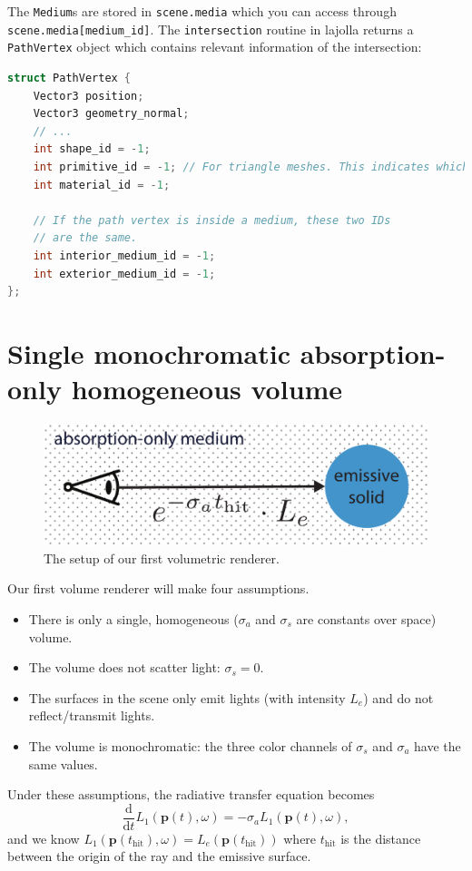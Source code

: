 The \lstinline{Medium}s are stored in \lstinline{scene.media} which you can access through \lstinline{scene.media[medium_id]}. The \lstinline{intersection} routine in lajolla returns a \lstinline{PathVertex} object which contains relevant information of the intersection:
\begin{lstlisting}[language=c++]
struct PathVertex {
    Vector3 position;
    Vector3 geometry_normal;
    // ...
    int shape_id = -1;
    int primitive_id = -1; // For triangle meshes. This indicates which triangle it hits.
    int material_id = -1;

    // If the path vertex is inside a medium, these two IDs
    // are the same.
    int interior_medium_id = -1;
    int exterior_medium_id = -1;
};
\end{lstlisting}

\section{Single monochromatic absorption-only homogeneous volume}
\begin{figure}
\includegraphics[width=\linewidth]{imgs/absorption_medium.pdf}
\caption{The setup of our first volumetric renderer.}
\label{fig:volpath1_illustration}
\end{figure}

Our first volume renderer will make four assumptions.
\begin{itemize}
    \item There is only a single, homogeneous ($\sigma_a$ and $\sigma_s$ are constants over space) volume.
    \item The volume does not scatter light: $\sigma_s = 0$.
    \item The surfaces in the scene only emit lights (with intensity $L_e$) and do not reflect/transmit lights.
    \item The volume is monochromatic: the three color channels of $\sigma_s$ and $\sigma_a$ have the same values.
\end{itemize}

Under these assumptions, the radiative transfer equation becomes
\begin{equation}
\frac{\mathrm{d}}{\mathrm{d}t} L_1(\mathbf{p}(t), \omega) = -\sigma_a L_1(\mathbf{p}(t), \omega),
\end{equation}
and we know $L_1(\mathbf{p}(t_{\text{hit}}), \omega) = L_e(\mathbf{p}(t_{\text{hit}}))$ where $t_{\text{hit}}$ is the distance between the origin of the ray and the emissive surface.

